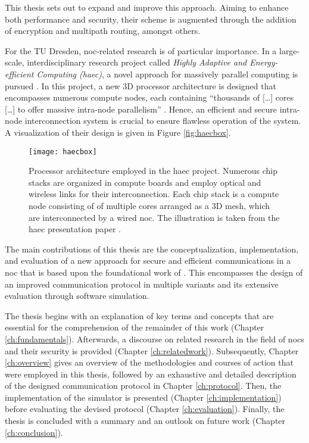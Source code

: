 This thesis sets out to expand and improve this approach. Aiming to enhance both performance and security, their scheme is augmented through the
addition of encryption and multipath routing, amongst others.

For the TU Dresden, \gls{noc}-related research is of particular importance. In a large-scale, interdisciplinary research project called \textit{Highly
Adaptive and Energy-efficient Computing (\gls{haec})}, a novel approach for massively parallel computing is pursued \cite{matthiesen17haec}. In this
project, a new 3D processor architecture is designed that encompasses numerous compute nodes, each containing \enquote{thousands of […] cores […] to
offer massive intra-node parallelism} \cite[1]{matthiesen17haec}. Hence, an efficient and secure intra-node interconnection system is crucial to
ensure flawless operation of the system. A visualization of their design is given in Figure \vref{fig:haecbox}.

\begin{figure}
    \centering
    \texttt{[image: haecbox]}
    \caption[Processor architecture in the HAEC project]{Processor architecture employed in the \gls{haec} project. Numerous chip stacks are organized
    in compute boards and employ optical and wireless links for their interconnection. Each chip stack is a compute node consisting of of multiple
    cores arranged as a 3D mesh, which are interconnected by a wired \gls{noc}. The illustration is taken from the \gls{haec} presentation paper
    \cite[1]{matthiesen17haec}.}
    \label{fig:haecbox}
\end{figure}

The main contributions of this thesis are the conceptualization, implementation, and evaluation of a new approach for secure and efficient
communications in a \gls{noc} that is based upon the foundational work of \citeauthor{moriam18activeattackers}
\cites{moriam15manycorenc}{moriam18activeattackers}. This encompasses the design of an improved communication protocol in multiple variants and its
extensive evaluation through software simulation.

The thesis begins with an explanation of key terms and concepts that are essential for the comprehension of the remainder of this work (Chapter
\ref{ch:fundamentals}). Afterwards, a discourse on related research in the field of \glspl{noc} and their security is provided (Chapter
\ref{ch:relatedwork}). Subsequently, Chapter \ref{ch:overview} gives an overview of the methodologies and courses of action that were employed in this
thesis, followed by an exhaustive and detailed description of the designed communication protocol in Chapter \ref{ch:protocol}. Then, the
implementation of the simulator is presented (Chapter \ref{ch:implementation}) before evaluating the devised protocol (Chapter \ref{ch:evaluation}).
Finally, the thesis is concluded with a summary and an outlook on future work (Chapter \ref{ch:conclusion}).
